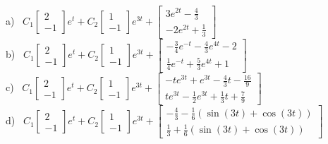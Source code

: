 {%
a)~ $C_1\left[\begin{smallmatrix} 2 \\ -1 \end{smallmatrix}\right]e^{t} + C_2\left[\begin{smallmatrix} 1 \\ -1 \end{smallmatrix}\right]e^{3t} + \left[\begin{smallmatrix} 3e^{2t} - \frac{4}{3} \\ -2e^{2t} + \frac{1}{3} \end{smallmatrix}\right]$ \\
b)~ $C_1\left[\begin{smallmatrix} 2 \\ -1 \end{smallmatrix}\right]e^{t} + C_2\left[\begin{smallmatrix} 1 \\ -1 \end{smallmatrix}\right]e^{3t} + \left[\begin{smallmatrix} -\frac{3}{4}e^{-t} - \frac{4}{3}e^{4t} - 2 \\ \frac{1}{4}e^{-t} + \frac{5}{3}e^{4t} + 1 \end{smallmatrix}\right]$\\
c)~ $C_1\left[\begin{smallmatrix} 2 \\ -1 \end{smallmatrix}\right]e^{t} + C_2\left[\begin{smallmatrix} 1 \\ -1 \end{smallmatrix}\right]e^{3t} + \left[\begin{smallmatrix} -te^{3t} + e^{3t} - \frac{4}{3}t - \frac{16}{9} \\ te^{3t} - \frac{1}{2}e^{3t} + \frac{1}{3}t + \frac{7}{9} \end{smallmatrix}\right]$\\
d)~ $C_1\left[\begin{smallmatrix} 2 \\ -1 \end{smallmatrix}\right]e^{t} + C_2\left[\begin{smallmatrix} 1 \\ -1 \end{smallmatrix}\right]e^{3t} + \left[\begin{smallmatrix} -\frac{4}{3} - \frac{1}{6}(\sin(3t) + \cos(3t)) \\ \frac{1}{3} + \frac{1}{6}(\sin(3t) + \cos(3t))\end{smallmatrix}\right]$ \\
}
